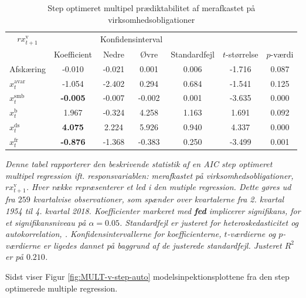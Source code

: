 \documentclass[
  a4paper,
  oneside]{memoir}
\begin{document}
\begin{table}[H]

\caption{\label{tab:MULT-step-v}Step optimeret multipel prædiktabilitet af merafkastet på virksomhedsobligationer}
\centering
\begin{threeparttable}
\begin{tabular}[t]{lcccccc}
\toprule
\multicolumn{1}{c}{$rx_{t+1}^{\text{v}}$} & \multicolumn{1}{c}{ } & \multicolumn{2}{c}{Konfidensinterval} & \multicolumn{3}{c}{ } \\
\cmidrule(l{3pt}r{3pt}){1-1} \cmidrule(l{3pt}r{3pt}){3-4}
  & Koefficient & Nedre & Øvre & Standardfejl & $t$-størrelse & $p$-værdi\\
\midrule
\rowcolor{gray!6}  Afskæring & -0.010 & -0.021 & 0.001 & 0.006 & -1.716 & 0.087\\
$x_t^{\text{avar}}$ & -1.054 & -2.402 & 0.294 & 0.684 & -1.541 & 0.125\\
\rowcolor{gray!6}  $x_t^{\text{smb}}$ & \textbf{-0.005} & -0.007 & -0.002 & 0.001 & -3.635 & 0.000\\
$x_t^{\text{b}}$ & 1.967 & -0.324 & 4.258 & 1.163 & 1.691 & 0.092\\
\rowcolor{gray!6}  $x_t^{\text{ds}}$ & \textbf{ 4.075} & 2.224 & 5.926 & 0.940 & 4.337 & 0.000\\
$x_t^{\text{fr}}$ & \textbf{-0.876} & -1.368 & -0.383 & 0.250 & -3.499 & 0.001\\
\bottomrule
\end{tabular}
\begin{tablenotes}
\item \textit{Denne tabel rapporterer den beskrivende statistik af en AIC step optimeret multipel regression ift. responsvariablen: merafkastet på virksomhedsobligationer, $rx_{t+1}^{\text{v}}$. Hver række repræsenterer et led i den mutiple regression. Dette gøres ud fra $259$ kvartalvise observationer, som spænder over kvartalerne fra 2. kvartal 1954 til 4. kvartal 2018. Koefficienter markeret med \textbf{fed} implicerer signifikans, for et signifikansniveau på $\alpha=0.05$. Standardfejl er justeret for heteroskedasticitet og autokorrelation, \citep{Newey1987}. Konfidensintervallerne for koefficienterne, $t$-værdierne og $p$-værdierne er ligedes dannet på baggrund af de justerede standardfejl. Justeret $R^2$ er på $0.210$.}
\end{tablenotes}
\end{threeparttable}
\end{table}

Sidst viser Figur \ref{fig:MULT-v-step-auto} modelsinpektionsplottene fra den step optimerede multiple regression.
\end{document}
